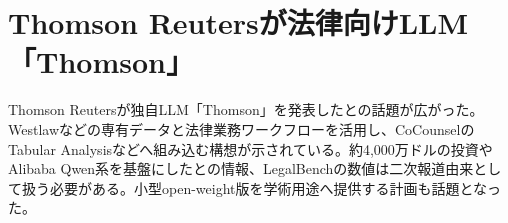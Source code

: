 \section{Thomson Reutersが法律向けLLM「Thomson」}
Thomson Reutersが独自LLM「Thomson」を発表したとの話題が広がった。Westlawなどの専有データと法律業務ワークフローを活用し、CoCounselのTabular Analysisなどへ組み込む構想が示されている。約4,000万ドルの投資やAlibaba Qwen系を基盤にしたとの情報、LegalBenchの数値は二次報道由来として扱う必要がある。小型open-weight版を学術用途へ提供する計画も話題となった。
